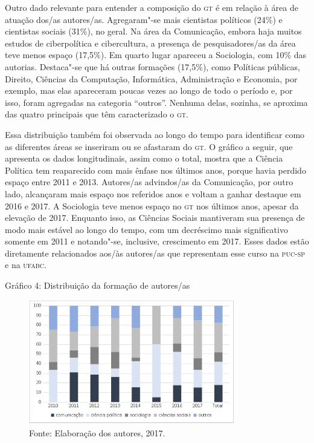 Outro dado relevante para entender a composição do \textsc{gt} é em relação à
área de atuação dos/as autores/as. Agregaram"-se mais cientistas
políticos (24\%) e cientistas sociais (31\%), no geral. Na área da
Comunicação, embora haja muitos estudos de ciberpolítica e cibercultura,
a presença de pesquisadores/as da área teve menos espaço (17,5\%). Em
quarto lugar apareceu a Sociologia, com 10\% das autorias. Destaca"-se
que há outras formações (17,5\%), como Políticas públicas, Direito,
Ciências da Computação, Informática, Administração e Economia, por
exemplo, mas elas apareceram poucas vezes ao longo de todo o período e,
por isso, foram agregadas na categoria ``outros''. Nenhuma delas,
sozinha, se aproxima das quatro principais que têm caracterizado o \textsc{gt}.

Essa distribuição também foi observada ao longo do tempo para
identificar como as diferentes áreas se inseriram ou se afastaram do \textsc{gt}.
O gráfico a seguir, que apresenta os dados longitudinais, assim como o
total, mostra que a Ciência Política tem reaparecido com mais ênfase nos
últimos anos, porque havia perdido espaço entre 2011 e 2013. Autores/as
advindos/as da Comunicação, por outro lado, alcançaram mais espaço nos
referidos anos e voltam a ganhar destaque em 2016 e 2017. A Sociologia
teve menos espaço no \textsc{gt} nos últimos anos, apesar da elevação de 2017.
Enquanto isso, as Ciências Sociais mantiveram sua presença de modo mais
estável ao longo do tempo, com um decréscimo mais significativo somente
em 2011 e notando"-se, inclusive, crescimento em 2017. Esses dados estão
diretamente relacionados aos/às autores/as que representam esse curso na
\textsc{puc}-\textsc{sp} e na \textsc{ufabc}.

\pagebreak

\begin{center}
Gráfico 4: Distribuição da formação de autores/as
\end{center}

\begin{figure}[!ht]
\centering
 \includegraphics[width=90mm]{./imgs/graf3_4.png}
\caption{Fonte: Elaboração dos autores, 2017.}
\end{figure}

